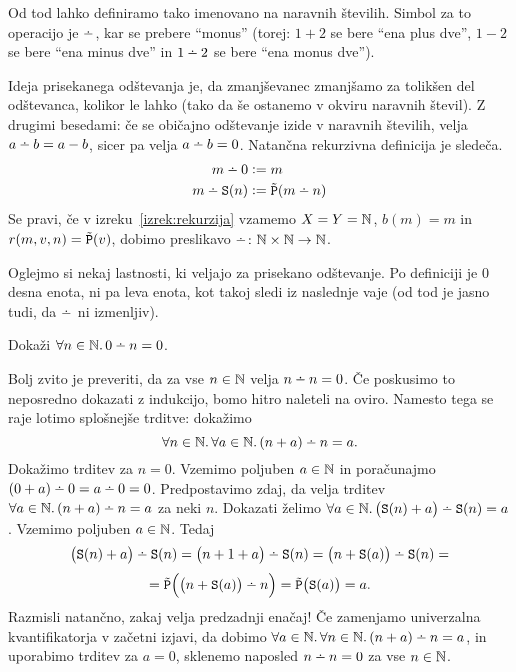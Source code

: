 Od tod lahko definiramo tako imenovano  na naravnih številih. Simbol za to operacijo je $\monus$, kar se prebere ``monus'' (torej: $1 + 2$ se bere ``ena plus dve'', $1 - 2$ se bere ``ena minus dve'' in $1 \monus 2$ se bere ``ena monus dve'').

Ideja prisekanega odštevanja je, da zmanjševanec zmanjšamo za tolikšen del odštevanca, kolikor le lahko (tako da še ostanemo v okviru naravnih števil). Z drugimi besedami: če se običajno odštevanje izide v naravnih številih, velja $a \monus b = a - b$, sicer pa velja $a \monus b = 0$. Natančna rekurzivna definicija je sledeča.
\begin{align*}
m \monus 0 &\dfeq m \\
m \monus \suc(n) &\dfeq \tprd(m \monus n)
\end{align*}
Se pravi, če v izreku~\ref{izrek:rekurzija} vzamemo $X = Y = \mathbb{N}$, $b(m) = m$ in $r(m, v, n) = \tilde{\mathtt{P}}(v)$, dobimo preslikavo $\monus\colon \NN \times \NN \to \NN$.


Oglejmo si nekaj lastnosti, ki veljajo za prisekano odštevanje. Po definiciji je $0$ desna enota, ni pa leva enota, kot takoj sledi iz naslednje vaje (od tod je jasno tudi, da $\monus$ ni izmenljiv).

\begin{naloga}
Dokaži $\all{n \in \NN}{0 \monus n = 0}$.
\end{naloga}

Bolj zvito je preveriti, da za vse $n \in \mathbb{N}$ velja $n \monus n = 0$. Če poskusimo to neposredno dokazati z indukcijo, bomo hitro naleteli na oviro. Namesto tega se raje lotimo splošnejše trditve: dokažimo
\[\all{n \in \NN}\all{a \in \NN}{(n + a) \monus n = a}.\]
Dokažimo trditev za $n = 0$. Vzemimo poljuben $a \in \mathbb{N}$ in poračunajmo $(0 + a) \monus 0 = a \monus 0 = 0$. Predpostavimo zdaj, da velja trditev $\all{a \in \NN}{(n + a) \monus n = a}$ za neki $n$. Dokazati želimo $\all{a \in \NN}{\big(\suc(n) + a\big) \monus \suc(n) = a}$. Vzemimo poljuben $a \in \mathbb{N}$. Tedaj
\[\big(\suc(n) + a\big) \monus \suc(n) = \big(n + 1 + a\big) \monus \suc(n) = \big(n + \suc(a)\big) \monus \suc(n) =\]
\[= \tprd\Big(\big(n + \suc(a)\big) \monus n\Big) = \tprd\big(\suc(a)\big) = a.\]
Razmisli natančno, zakaj velja predzadnji enačaj! Če zamenjamo univerzalna kvantifikatorja v začetni izjavi, da dobimo $\all{a \in \NN}\all{n \in \NN}{(n + a) \monus n = a}$, in uporabimo trditev za $a = 0$, sklenemo naposled $n \monus n = 0$ za vse $n \in \mathbb{N}$.

